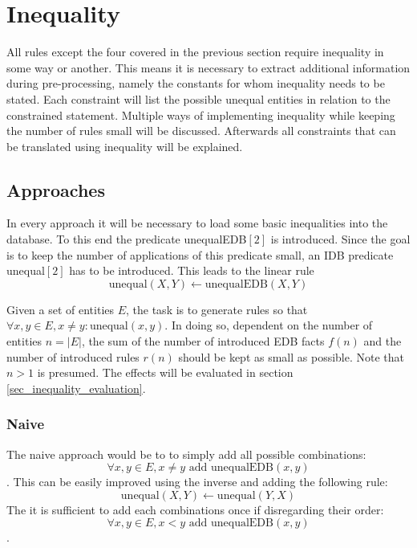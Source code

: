 \documentclass[hyperref,bachelorofscience,fleqn]{cgvpub}
\begin{document}
\section{Inequality}\label{sec_inequality}
All rules except the four covered in the previous section require inequality in some way or another. This means it is necessary to extract additional information during pre-processing, namely the constants for whom inequality needs to be stated. Each constraint will list the possible unequal entities in relation to the constrained statement. Multiple ways of implementing inequality while keeping the number of rules small will be discussed. Afterwards all constraints that can be translated using inequality will be explained.

\subsection{Approaches}
In every approach it will be necessary to load some basic inequalities into the database. To this end the predicate unequalEDB\([2]\) is introduced. Since the goal is to keep the number of applications of this predicate small, an IDB predicate unequal\([2]\) has to be introduced. This leads to the linear rule
\begin{equation*}
\text{unequal}(X, Y) \leftarrow \text{unequalEDB}(X, Y)
\end{equation*}

Given a set of entities \(E\), the task is to generate rules so that \(\forall x, y \in E, x \ne y: \text{unequal}(x, y)\). In doing so, dependent on the number of entities \(n = |E|\), the sum of the number of introduced EDB facts \(f(n)\) and the number of introduced rules \(r(n)\) should be kept as small as possible. Note that \(n > 1\) is presumed. The effects will be evaluated in section \ref{sec_inequality_evaluation}.

\subsubsection{Naive}\label{subsubsec_naive}
The naive approach would be to to simply add all possible combinations:
\begin{equation*}
\forall x, y \in E, x \ne y \text{ add } \text{unequalEDB}(x, y)
\end{equation*}.
This can be easily improved using the inverse and adding the following rule:
\begin{equation}\label{equ_inverse}
\text{unequal}(X, Y) \leftarrow \text{unequal}(Y, X)
\end{equation}
The it is sufficient to add each combinations once if disregarding their order:
\begin{equation*}
\forall x, y \in E, x < y \text{ add } \text{unequalEDB}(x, y)
\end{equation*}.
\end{document}
